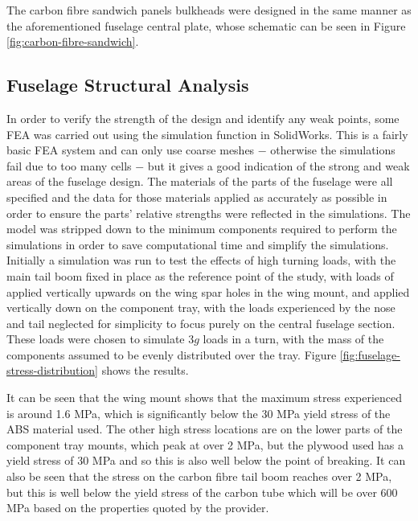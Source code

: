 \documentclass[../../main.tex]{subfiles}
\begin{document}
The carbon fibre sandwich panels bulkheads were designed in the same manner as the aforementioned fuselage central plate, whose schematic can be seen in Figure \ref{fig:carbon-fibre-sandwich}. 


\subsection{Fuselage Structural Analysis} \label{sec:final-design-proposal:fuselage:finite-element-analysis}

In order to verify the strength of the design and identify any weak points, some FEA was carried out using the simulation function in SolidWorks.
This is a fairly basic FEA system and can only use coarse meshes $-$ otherwise the simulations fail due to too many cells $-$ but it gives a good indication of the strong and weak areas of the fuselage design.
The materials of the parts of the fuselage were all specified and the data for those materials applied as accurately as possible in order to ensure the parts' relative strengths were reflected in the simulations.
The model was stripped down to the minimum components required to perform the simulations in order to save computational time and simplify the simulations.
Initially a simulation was run to test the effects of high turning loads, with the main tail boom fixed in place as the reference point of the study, with loads of  applied vertically upwards on the wing spar holes in the wing mount, and  applied vertically down on the component tray, with the loads experienced by the nose and tail neglected for simplicity to focus purely on the central fuselage section.
These loads were chosen to simulate $3g$ loads in a turn, with the mass of the components assumed to be evenly distributed over the tray.
Figure \ref{fig:fuselage-stress-distribution} shows the results.


It can be seen that the wing mount shows that the maximum stress experienced is around 1.6 MPa, which is significantly below the 30 MPa yield stress of the ABS material used.
The other high stress locations are on the lower parts of the component tray mounts, which peak at over 2 MPa, but the plywood used has a yield stress of 30 MPa and so this is also well below the point of breaking.
It can also be seen that the stress on the carbon fibre tail boom reaches over 2 MPa, but this is well below the yield stress of the carbon tube which will be over 600 MPa based on the properties quoted by the provider. %
\end{document}
